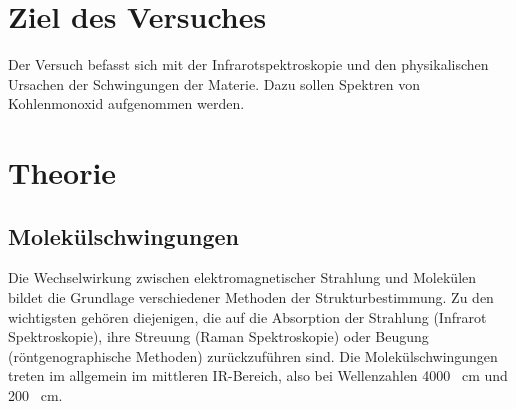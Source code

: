 \documentclass[13pt]{article}
\begin{document}
\section{Ziel des Versuches}
Der Versuch befasst sich mit der Infrarotspektroskopie und den physikalischen Ursachen der Schwingungen der Materie.
Dazu sollen Spektren von Kohlenmonoxid aufgenommen werden.
\section {Theorie\supercite{fadini}}
\subsection{Molekülschwingungen}
Die Wechselwirkung zwischen elektromagnetischer Strahlung und Molekülen
bildet die Grundlage verschiedener Methoden der Strukturbestimmung. Zu den wichtigsten
gehören diejenigen, die auf die Absorption der Strahlung (Infrarot Spektroskopie),
ihre Streuung (Raman Spektroskopie) oder Beugung (röntgenographische Methoden)
zurückzuführen sind.
Die Molekülschwingungen treten im allgemein im mittleren IR-Bereich,
also bei Wellenzahlen 4000 \si{\per\centi\meter} und 200 \si{\per\centi\meter}.
\end{document}
